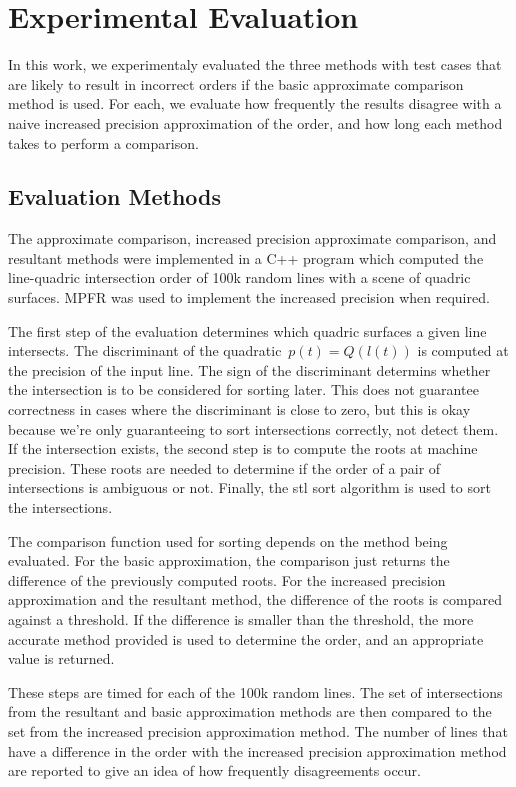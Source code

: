 \documentclass{cccg16}
\begin{document}
\section{Experimental Evaluation}
In this work, we experimentaly evaluated the three methods with test
cases that are likely to result in incorrect orders if the basic
approximate comparison method is used.  For each, we evaluate how
frequently the results disagree with a naive increased precision
approximation of the order, and how long each method takes to perform
a comparison.

\subsection{Evaluation Methods}
The approximate comparison, increased precision approximate
comparison, and resultant methods were implemented in a C++ program
which computed the line-quadric intersection order of 100k random
lines with a scene of quadric surfaces.  MPFR was used to implement
the increased precision when required.

The first step of the evaluation determines which quadric surfaces a
given line intersects.  The discriminant of the
quadratic~$p(t)=Q(l(t))$ is computed at the precision of the input
line.  The sign of the discriminant determins whether the intersection
is to be considered for sorting later.  This does not guarantee
correctness in cases where the discriminant is close to zero, but this
is okay because we're only guaranteeing to sort intersections
correctly, not detect them.  If the intersection exists, the second
step is to compute the roots at machine precision.  These roots are
needed to determine if the order of a pair of intersections is
ambiguous or not.  Finally, the stl sort algorithm is used to sort the
intersections.

The comparison function used for sorting depends on the method being
evaluated.  For the basic approximation, the comparison just returns
the difference of the previously computed roots.  For the increased
precision approximation and the resultant method, the difference of
the roots is compared against a threshold.  If the difference is
smaller than the threshold, the more accurate method provided is used
to determine the order, and an appropriate value is returned.

These steps are timed for each of the 100k random lines.  The set of
intersections from the resultant and basic approximation methods are
then compared to the set from the increased precision approximation
method.  The number of lines that have a difference in the order with
the increased precision approximation method are reported to give an
idea of how frequently disagreements occur.
\end{document}
